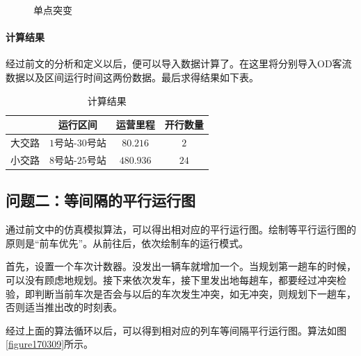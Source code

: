 \begin{enumerate}
\begin{itemize}
\begin{figure}[h]
            \caption{单点突变}
            \label{figure170202}
        \end{figure}
    \end{itemize}
\end{enumerate}


\paragraph{计算结果}

经过前文的分析和定义以后，便可以导入数据计算了。在这里将分别导入OD客流数据以及区间运行时间这两份数据。最后求得结果如下表。

\begin{table}[h]
    \centering
    \caption{计算结果}
    \begin{tabular}{cccc}
    \hline
        & 运行区间     & 运营里程   & 开行数量 \\ \hline
    大交路 & $1$号站-$30$号站 & $80.216$ & $2$    \\
    小交路 & $8$号站-$25$号站 & $480.936$ & $24$   \\ \hline
    \end{tabular}
\end{table}


\subsection{问题二：等间隔的平行运行图}

通过前文中的仿真模拟算法，可以得出相对应的平行运行图。绘制等平行运行图的原则是“前车优先”。从前往后，依次绘制车的运行模式。

首先，设置一个车次计数器。没发出一辆车就增加一个。当规划第一趟车的时候，可以没有顾虑地规划。接下来依次发车，接下里发出地每趟车，都要经过冲突检验，即判断当前车次是否会与以后的车次发生冲突，如无冲突，则规划下一趟车，否则适当推出改的时刻表。

经过上面的算法循环以后，可以得到相对应的列车等间隔平行运行图。算法如图\ref{figure170309}所示。

